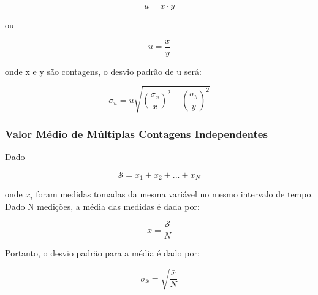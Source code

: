 \documentclass[11pt,a4paper]{article}
\begin{document}
			\begin{equation*}
				u = x \cdot y
			\end{equation*}

		\noindent ou

			\begin{equation*}
				u = \frac{x}{y}
			\end{equation*}

		\noindent onde x e y são contagens, o desvio padrão de u será:

			\begin{equation}
				\sigma_u = u \sqrt{\left(\frac{\sigma_x}{x}\right)^2 + \left(\frac{\sigma_y}{y}\right)^2}
			\end{equation}

	\subsubsection*{Valor Médio de Múltiplas Contagens Independentes}

		Dado 

			\begin{equation*}
				\mathcal{S} = x_1 + x_2 + ... + x_N
			\end{equation*}

		\noindent onde $x_i$ foram medidas tomadas da mesma variável no mesmo intervalo de tempo. Dado N medições, a média das medidas é dada por:

			\begin{equation*}
				\bar{x} = \frac{\mathcal{S}}{N}
			\end{equation*}

		\noindent Portanto, o desvio padrão para a média é dado por:

			\begin{equation}
				\sigma_{\bar{x}} = \sqrt{\frac{\bar{x}}{N}}
			\end{equation}



	


\end{document}
